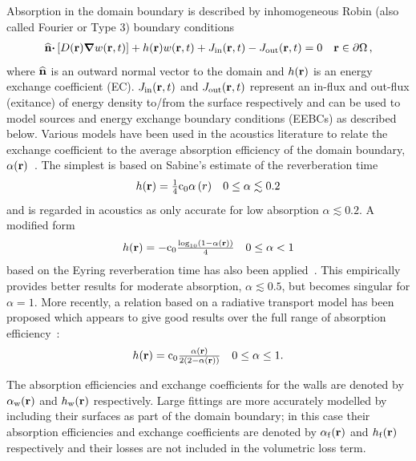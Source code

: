\documentclass[a4paper]{article}
\numberwithin{equation}{section}
\begin{document}
Absorption in the domain boundary is described by inhomogeneous Robin (also
called Fourier or Type 3) boundary conditions
\begin{align}
\begin{matrix}
\widehat{\boldsymbol{\mathrm{n}}}\boldsymbol{\mathrm{\cdot}}\left[D(\boldsymbol{\mathrm{r}})\boldsymbol{\mathrm{\nabla}} w(\boldsymbol{\mathrm{r}},t)\right] + h(\boldsymbol{\mathrm{r}}) w(\boldsymbol{\mathrm{r}},t) + J_\mathrm{in}(\boldsymbol{\mathrm{r}},t) - J_\mathrm{out}(\boldsymbol{\mathrm{r}},t) = 0 &\boldsymbol{\mathrm{r}}\in\partial\Omega\,,
\end{matrix}
\end{align}
where $\widehat{\boldsymbol{\mathrm{n}}}$ is an outward normal vector to the domain and 
$h(\boldsymbol{\mathrm{r}})$ is an energy exchange coefficient (EC). $J_\mathrm{in}(\boldsymbol{\mathrm{r}},t)$ and
$J_\mathrm{out}(\boldsymbol{\mathrm{r}},t)$ represent an in-flux and out-flux (exitance) of energy density to/from the surface 
respectively and can be used to model sources and energy exchange boundary conditions (EEBCs) as described below.
Various models have been used in the acoustics literature to relate the exchange coefficient to the
average absorption efficiency of the domain boundary, $\alpha(\boldsymbol{\mathrm{r}})$~\citep{Jing2008,Xiang2009}. The
simplest is based on Sabine's estimate of the reverberation time~\citep{Sabine1922}
\begin{align}
\label{eq:ecsabine}
\begin{matrix}
h(\boldsymbol{\mathrm{r}}) = \frac{1}{4}\mathrm{c}_0\alpha \left(r\right)&0\leq\alpha\lesssim 0.2
\end{matrix}
\end{align}
and is regarded in acoustics as only accurate for low absorption $\alpha\lesssim 0.2$. 
A modified form
\begin{align}
\begin{matrix}
h(\boldsymbol{\mathrm{r}}) = -\mathrm{c}_0\frac{\log_{10}\left(1-\alpha(\boldsymbol{\mathrm{r}})\right)}{4} &0\leq\alpha< 1
\end{matrix}
\end{align}
based on the Eyring reverberation time has also been applied~\citep{Eyring1930}.
This empirically provides better results for moderate absorption, $\alpha\lesssim 0.5$, 
but becomes singular for $\alpha=1$. More recently, a relation based on
a radiative transport model has been proposed which appears to give good
results over the full range of absorption efficiency~\citep{Jing2008}:
\begin{align}
\label{eq:ecjing}
\begin{matrix}
h(\boldsymbol{\mathrm{r}}) =\mathrm{c}_0\frac{\alpha(\boldsymbol{\mathrm{r}})}{2\left(2-\alpha(\boldsymbol{\mathrm{r}})\right)} & 0\leq\alpha\leq 1 .
\end{matrix}
\end{align}

The absorption efficiencies and exchange coefficients for the walls are denoted 
by $\alpha_{\mathrm{w}}(\boldsymbol{\mathrm{r}})$ and $h_{\mathrm{w}}(\boldsymbol{\mathrm{r}})$ respectively. Large fittings are more
accurately modelled by including their surfaces as part of the domain boundary; in 
this case their absorption efficiencies and exchange coefficients are denoted by
$\alpha_{\mathrm{f}}(\boldsymbol{\mathrm{r}})$ and $h_{\mathrm{f}}(\boldsymbol{\mathrm{r}})$ respectively and their losses are not included in the
volumetric loss term.
\end{document}
